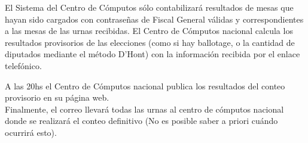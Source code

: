 El Sistema del Centro de Cómputos sólo contabilizará resultados de mesas que hayan sido cargados con contraseñas de Fiscal General válidas y correspondientes a las mesas de las urnas recibidas.
El Centro de Cómputos nacional calcula los resultados provisorios de las elecciones (como si hay ballotage, o la cantidad de diputados mediante el método D’Hont) con la información recibida por el enlace telefónico.

A las 20hs el Centro de Cómputos nacional publica los resultados del conteo provisorio en su página web.\\

Finalmente, el correo llevará todas las urnas al centro de cómputos nacional donde se realizará el conteo definitivo (No es posible saber a priori cuándo ocurrirá esto).


